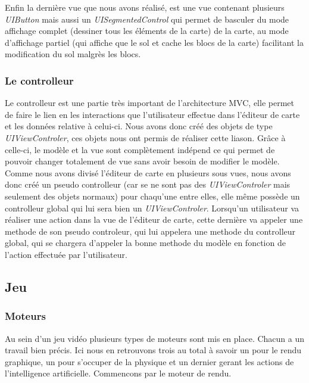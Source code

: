 		\begin{center}
		\end{center}
		Enfin la dernière vue que nous avons réalisé, est une vue contenant plusieurs \textit{UIButton} mais aussi un \textit{UISegmentedControl} qui permet de basculer du mode affichage complet (dessiner tous les éléments de la carte) de la carte, au mode d'affichage partiel (qui affiche que le sol et cache les blocs de la carte) facilitant la modification du sol malgrès les blocs.
			
			
	\subsubsection{Le controlleur}
		
		Le controlleur est une partie très important de l'architecture MVC, elle permet de faire le lien en les interactions que l'utilisateur effectue dans l'éditeur de carte et les données relative à celui-ci. Nous avons  donc créé des objets de type \textit{UIViewControler}, ces objets nous ont permis de réaliser cette liason. Grâce à celle-ci, le modèle et la vue sont complètement indépend ce qui permet de pouvoir changer totalement de vue sans avoir besoin de modifier le modèle. Comme nous avons divisé l'éditeur de carte en plusieurs sous vues, nous avons donc créé un \og pseudo \fg controlleur (car se ne sont pas des \textit{UIViewControler} mais seulement des objets normaux) pour chaqu'une entre elles, elle même possède un controlleur global qui lui sera bien un \textit{UIViewControler}. Lorsqu'un utilisateur va réaliser une action dans la vue de l'éditeur de carte, cette dernière va appeler une methode de son pseudo controleur, qui lui appelera une methode du controlleur global, qui se chargera d'appeler la bonne methode du modèle en fonction de l'action effectuée par l'utilisateur. 



\subsection{Jeu}

	\subsubsection{Moteurs}
	
		Au sein d'un jeu vidéo plusieurs types de moteurs sont mis en place.
		Chacun a un travail bien précis.
		Ici nous en retrouvons trois au total à savoir un pour le rendu graphique, un
		pour s'occuper de la physique et un dernier gerant les actions de
		l'intelligence artificielle.
		Commencons par le moteur de rendu.
	
